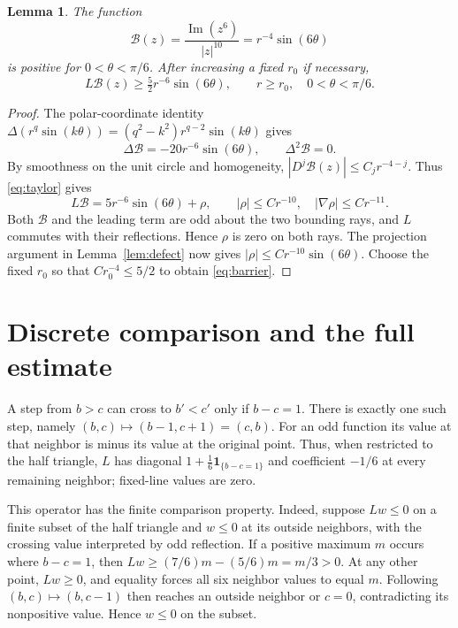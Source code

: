 \documentclass[11pt]{article}
\newtheorem{lemma}{Lemma}
\newcommand{\barrier}{\mathcal B}
\begin{document}
\begin{lemma}\label{lem:barrier}
The function
\[
 \barrier(z)=\frac{\operatorname{Im}(z^6)}{|z|^{10}}
           =r^{-4}\sin(6\theta)
\]
is positive for $0<\theta<\pi/6$. After increasing a fixed $r_0$ if necessary,
\begin{equation}\label{eq:barrier}
 L\barrier(z)\ge\tfrac52 r^{-6}\sin(6\theta),\qquad r\ge r_0,
 \quad 0<\theta<\pi/6.
\end{equation}
\end{lemma}
\begin{proof}
The polar-coordinate identity
$\Delta(r^q\sin(k\theta))=(q^2-k^2)r^{q-2}\sin(k\theta)$ gives
\[
 \Delta\barrier=-20r^{-6}\sin(6\theta),\qquad
 \Delta^2\barrier=0.
\]
By smoothness on the unit circle and homogeneity,
$|D^j\barrier(z)|\le C_jr^{-4-j}$. Thus \eqref{eq:taylor} gives
\[
 L\barrier=5r^{-6}\sin(6\theta)+\rho,
 \qquad |\rho|\le Cr^{-10},\quad |\nabla\rho|\le Cr^{-11}.
\]
Both $\barrier$ and the leading term are odd about the two bounding rays,
and $L$ commutes with their reflections. Hence $\rho$ is zero on both rays.
The projection argument in Lemma~\ref{lem:defect} now gives
$|\rho|\le Cr^{-10}\sin(6\theta)$. Choose the fixed $r_0$ so that
$Cr_0^{-4}\le5/2$ to obtain \eqref{eq:barrier}.
\end{proof}

\section{Discrete comparison and the full estimate}

A step from $b>c$ can cross to $b'<c'$ only if $b-c=1$.
There is exactly one such step, namely
$(b,c)\mapsto(b-1,c+1)=(c,b)$. For an odd function its value at that
neighbor is minus its value at the original point. Thus, when restricted to
the half triangle, $L$ has diagonal
$1+\tfrac16\mathbf1_{\{b-c=1\}}$ and coefficient $-1/6$ at every remaining
neighbor; fixed-line values are zero.

This operator has the finite comparison property. Indeed, suppose $Lw\le0$
on a finite subset of the half triangle and $w\le0$ at its outside
neighbors, with the crossing value interpreted by odd reflection.
If a positive maximum $m$ occurs where $b-c=1$, then
$Lw\ge(7/6)m-(5/6)m=m/3>0$. At any other point, $Lw\ge0$,
and equality forces all six neighbor values to equal $m$.
Following $(b,c)\mapsto(b,c-1)$ then reaches an outside neighbor or $c=0$,
contradicting its nonpositive value. Hence $w\le0$ on the subset.
\end{document}

